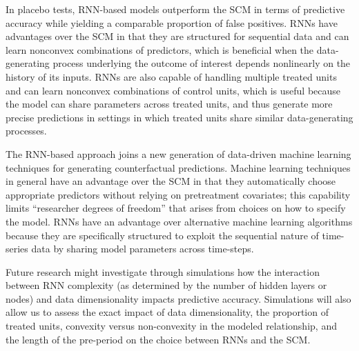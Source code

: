 \documentclass[hidelinks,12pt]{article}
\begin{document}
In placebo tests, RNN-based models outperform the SCM in terms of predictive accuracy while yielding a comparable proportion of false positives. RNNs have advantages over the SCM in that they are structured for sequential data and can learn nonconvex combinations of predictors, which is beneficial when the data-generating process underlying the outcome of interest depends nonlinearly on the history of its inputs. RNNs are also capable of handling multiple treated units and can learn nonconvex combinations of control units, which is useful because the model can share parameters across treated units, and thus generate more precise predictions in settings in which treated units share similar data-generating processes.

The RNN-based approach joins a new generation of data-driven machine learning techniques for generating counterfactual predictions. Machine learning techniques in general have an advantage over the SCM in that they automatically choose appropriate predictors without relying on pretreatment covariates; this capability limits ``researcher degrees of freedom'' that arises from choices on how to specify the model. RNNs have an advantage over alternative machine learning algorithms because they are specifically structured to exploit the sequential nature of time-series data by sharing model parameters across time-steps.

Future research might investigate through simulations how the interaction between RNN complexity (as determined by the number of hidden layers or nodes) and data dimensionality impacts predictive accuracy. Simulations will also allow us to assess the exact impact of data dimensionality, the proportion of treated units, convexity versus non-convexity in the modeled relationship, and the length of the pre-period on the choice between RNNs and the SCM. %

\newpage


\begin{singlespace}
	\begin{footnotesize}
		\begin{multicols}{2}
			
		\end{multicols}
	\end{footnotesize}
\end{singlespace}

\itemize
\end{document}
